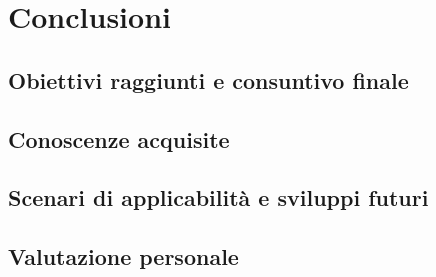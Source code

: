 \chapter{Conclusioni}
\label{cap:conclusioni}

\section{Obiettivi raggiunti e consuntivo finale}

\section{Conoscenze acquisite}

\section{Scenari di applicabilità e sviluppi futuri}

\section{Valutazione personale}
